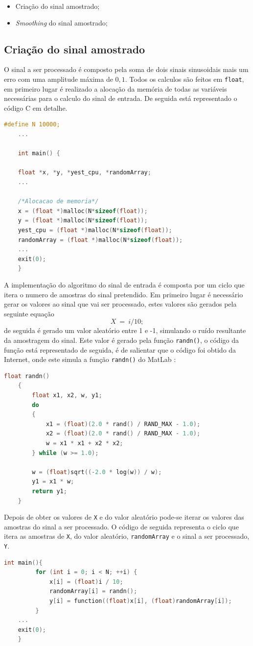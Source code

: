 \documentclass[11pt]{article}
\numberwithin{equation}{section}
\begin{document}
\begin{itemize}
	\vspace{-3mm}
	\item Criação do sinal amostrado;
	\vspace{-1.5mm}
	\item  \textit{Smoothing}  do sinal amostrado;
\end{itemize}
	\subsection{Criação do sinal amostrado}
	O sinal a ser processado é composto pela soma de dois sinais sinusoidais mais um erro com uma amplitude máxima de $0,1$. 
	Todos os calculos são feitos em \texttt{float}, em primeiro lugar é realizado a alocação da memória de todas as variáveis necessárias para o calculo do sinal de entrada. De seguida está representado o código C em detalhe.
\begin{lstlisting}[language=C]
#define N 10000;
	...

	int main() {
	
	float *x, *y, *yest_cpu, *randomArray;
	...
	
	/*Alocacao de memoria*/
	x = (float *)malloc(N*sizeof(float));
	y = (float *)malloc(N*sizeof(float));
	yest_cpu = (float *)malloc(N*sizeof(float));
	randomArray = (float *)malloc(N*sizeof(float));
	...
	exit(0);
	}
\end{lstlisting}

	A implementação do algoritmo do sinal de entrada é composta por um ciclo que itera o numero de amostras do sinal pretendido. Em primeiro lugar é necessário gerar os valores ao sinal que vai ser processado, estes valores são gerados pela seguinte equação
	\vspace{-3mm}
	\begin{equation}
		X ~= ~i/10; 
	\end{equation}
	de seguida é gerado um valor aleatório entre 1 e -1, simulando o ruído resultante da
	amostragem do sinal. Este valor é gerado pela função \texttt{randn()}, o código da função está representado de seguida, é de salientar que o código foi obtido da Internet, onde este simula a função \texttt{randn()} do MatLab :
	\begin{lstlisting}[language=C]
	float randn()
	{
		float x1, x2, w, y1;
		do
		{
			x1 = (float)(2.0 * rand() / RAND_MAX - 1.0);
			x2 = (float)(2.0 * rand() / RAND_MAX - 1.0);
			w = x1 * x1 + x2 * x2;
		} while (w >= 1.0);
	
		w = (float)sqrt((-2.0 * log(w)) / w);
		y1 = x1 * w;
		return y1;
	}
	\end{lstlisting}
	 Depois de obter os valores de \texttt{X} e do valor aleatório pode-se iterar os valores das amostras do sinal a ser processado. O código de seguida representa o ciclo que itera as amostras de \texttt{X}, do valor aleatório, \texttt{randomArray} e o sinal a ser processado, \texttt{Y}.
	 \begin{lstlisting}[language=C]
	 int main(){
		 for (int i = 0; i < N; ++i) {
			 x[i] = (float)i / 10;
			 randomArray[i] = randn();
			 y[i] = function((float)x[i], (float)randomArray[i]);
		 }
	...
	exit(0);
	}
	 \end{lstlisting}
	 
\end{document}
